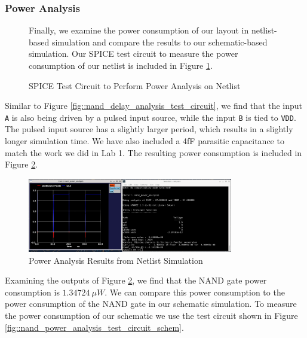 \documentclass{article}
\begin{document}
	\subsubsection{Power Analysis}
	\begin{figure}[H]
	
	Finally, we examine the power consumption of our layout in netlist-based simulation and compare the results to our schematic-based simulation. Our SPICE test circuit to measure the power consumption of our netlist is included in Figure \ref{fig::nand_power_analysis_test_circuit}.
		
		\caption{SPICE Test Circuit to Perform Power Analysis on Netlist}
		\label{fig::nand_power_analysis_test_circuit}
	\end{figure}
	
	\noindent Similar to Figure \ref{fig::nand_delay_analysis_test_circuit}, we find that the input \texttt{A} is also being driven by a pulsed input source, while the input \texttt{B} is tied to \texttt{VDD}. The pulsed input source has a slightly larger period, which results in a slightly longer simulation time. We have also included a 4fF parasitic capacitance to match the work we did in Lab 1. The resulting power consumption is included in Figure \ref{fig::nand_power_analysis}.
	
	\begin{figure}[H]
		\centerline{\includegraphics[width=0.8\textwidth]{nand_power_analysis.png}}
		\caption{Power Analysis Results from Netlist Simulation}
		\label{fig::nand_power_analysis}
	\end{figure}
	
	\noindent Examining the outputs of Figure \ref{fig::nand_power_analysis}, we find that the NAND gate power consumption is $1.34724\ \mu{W}$. We can compare this power consumption to the power consumption of the NAND gate in our schematic simulation. To measure the power consumption of our schematic we use the test circuit shown in Figure \ref{fig::nand_power_analysis_test_circuit_schem}.
	
\end{document}
